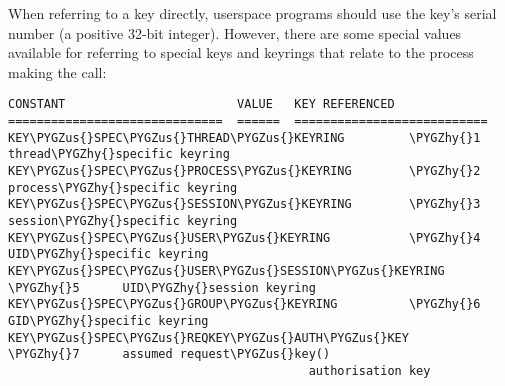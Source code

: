 \documentclass[a4paper,8pt,english]{sphinxmanual}
\def\PYGZus{\char`\_}
\def\PYGZhy{\char`\-}
\begin{document}
When referring to a key directly, userspace programs should use the key's
serial number (a positive 32-bit integer). However, there are some special
values available for referring to special keys and keyrings that relate to the
process making the call:

\begin{Verbatim}[commandchars=\\\{\}]
CONSTANT                        VALUE   KEY REFERENCED
==============================  ======  ===========================
KEY\PYGZus{}SPEC\PYGZus{}THREAD\PYGZus{}KEYRING         \PYGZhy{}1      thread\PYGZhy{}specific keyring
KEY\PYGZus{}SPEC\PYGZus{}PROCESS\PYGZus{}KEYRING        \PYGZhy{}2      process\PYGZhy{}specific keyring
KEY\PYGZus{}SPEC\PYGZus{}SESSION\PYGZus{}KEYRING        \PYGZhy{}3      session\PYGZhy{}specific keyring
KEY\PYGZus{}SPEC\PYGZus{}USER\PYGZus{}KEYRING           \PYGZhy{}4      UID\PYGZhy{}specific keyring
KEY\PYGZus{}SPEC\PYGZus{}USER\PYGZus{}SESSION\PYGZus{}KEYRING   \PYGZhy{}5      UID\PYGZhy{}session keyring
KEY\PYGZus{}SPEC\PYGZus{}GROUP\PYGZus{}KEYRING          \PYGZhy{}6      GID\PYGZhy{}specific keyring
KEY\PYGZus{}SPEC\PYGZus{}REQKEY\PYGZus{}AUTH\PYGZus{}KEY        \PYGZhy{}7      assumed request\PYGZus{}key()
                                          authorisation key
\end{Verbatim}
\end{document}
